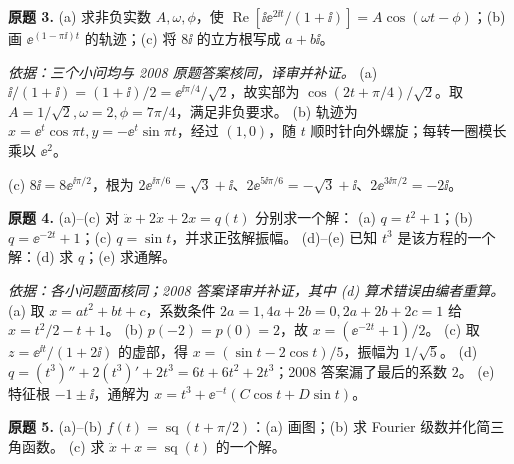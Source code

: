 \begin{exercise}\label{cw:prfinal-3}\textbf{原题 3.}
(a) 求非负实数 $A,\omega,\phi$，使 $\operatorname{Re}[\ii\ee^{2\ii t}/(1+\ii)]=A\cos(\omega t-\phi)$；(b) 画 $\ee^{(1-\pi\ii)t}$ 的轨迹；(c) 将 $8\ii$ 的立方根写成 $a+b\ii$。
\end{exercise}
\begin{solution}
\textit{依据：三个小问均与 2008 原题答案核同，译审并补证。}
(a) $\ii/(1+\ii)=(1+\ii)/2=\ee^{\ii\pi/4}/\sqrt2$，故实部为 $\cos(2t+\pi/4)/\sqrt2$。取 $A=1/\sqrt2,\omega=2,\phi=7\pi/4$，满足非负要求。
(b) 轨迹为 $x=\ee^t\cos\pi t,y=-\ee^t\sin\pi t$，经过 $(1,0)$，随 $t$ 顺时针向外螺旋；每转一圈模长乘以 $\ee^2$。
\begin{center}\end{center}
(c) $8\ii=8\ee^{\ii\pi/2}$，根为 $2\ee^{\ii\pi/6}=\sqrt3+\ii$、$2\ee^{5\ii\pi/6}=-\sqrt3+\ii$、$2\ee^{3\ii\pi/2}=-2\ii$。
\end{solution}
\begin{exercise}\label{cw:prfinal-4}\textbf{原题 4.}
(a)--(c) 对 $\ddot x+2\dot x+2x=q(t)$ 分别求一个解：
(a) $q=t^2+1$；(b) $q=\ee^{-2t}+1$；(c) $q=\sin t$，并求正弦解振幅。
(d)--(e) 已知 $t^3$ 是该方程的一个解：(d) 求 $q$；(e) 求通解。
\end{exercise}
\begin{solution}
\textit{依据：各小问题面核同；2008 答案译审并补证，其中 (d) 算术错误由编者重算。}
(a) 取 $x=at^2+bt+c$，系数条件 $2a=1,4a+2b=0,2a+2b+2c=1$ 给 $x=t^2/2-t+1$。
(b) $p(-2)=p(0)=2$，故 $x=(\ee^{-2t}+1)/2$。
(c) 取 $z=\ee^{\ii t}/(1+2\ii)$ 的虚部，得 $x=(\sin t-2\cos t)/5$，振幅为 $1/\sqrt5$。
(d) $q=(t^3)''+2(t^3)'+2t^3=6t+6t^2+2t^3$；2008 答案漏了最后的系数 $2$。
(e) 特征根 $-1\pm\ii$，通解为 $x=t^3+\ee^{-t}(C\cos t+D\sin t)$。
\end{solution}
\begin{exercise}\label{cw:prfinal-5}\textbf{原题 5.}
(a)--(b) $f(t)=\operatorname{sq}(t+\pi/2)$：(a) 画图；(b) 求 Fourier 级数并化简三角函数。
(c) 求 $\ddot x+x=\operatorname{sq}(t)$ 的一个解。
\end{exercise}
